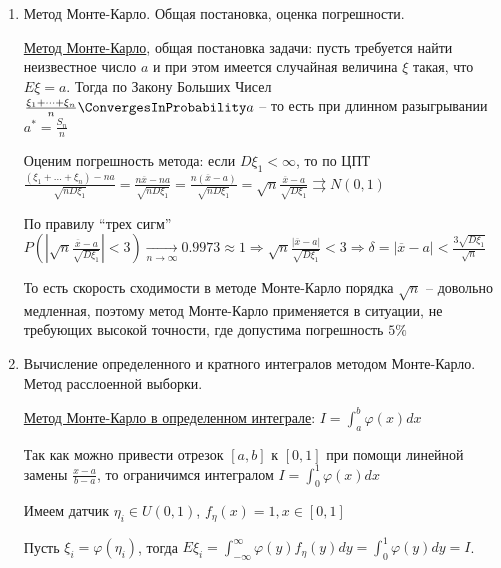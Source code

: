 \documentclass[12pt]{article}
\begin{document}
\begin{enumerate}
\begin{enumerate}[label*=\Roman*. ]
\begin{MyTheorem}
            Тогда $N \in \Pi_\lambda$
        \end{MyTheorem}

        Алгоритм: проводим серию $k$-ую серию испытаний до тех пор, пока $\prod^k_{i = 1} y_i < e^{-\lambda}$, тогда $\xi_i = k$

    \end{enumerate}


    \item Метод Монте-Карло. Общая постановка, оценка погрешности.

    \hyperlink{monte_carlo}{Метод Монте-Карло}, общая постановка задачи: пусть требуется найти неизвестное число $a$ и при этом имеется случайная величина $\xi$ такая, что $E \xi = a$. Тогда по Закону Больших Чисел $\frac{\xi_1 + \dots + \xi_n}{n} \ConvergesInProbability a$ -- то есть при длинном разыгрывании $a^* = \frac{S_n}{n}$

    Оценим погрешность метода: если $D\xi_1 < \infty$, то по ЦПТ $\frac{(\xi_1 + \dots + \xi_n) - n a}{\sqrt{n D \xi_1}} = \frac{n \overline{x} - na}{\sqrt{n D\xi_1}} = \frac{n(\overline{x} - a)}{\sqrt{n D\xi_1}} = \sqrt{n} \frac{\overline{x} - a}{\sqrt{D\xi_1}} \rightrightarrows N(0, 1)$

    По правилу \enquote{трех сигм} $P\left(\left|\sqrt{n} \frac{\overline{x} - a}{\sqrt{D\xi_1}}\right| < 3\right) \underset{n \to \infty}{\longrightarrow} 0.9973 \approx 1 \Longrightarrow \sqrt{n} \frac{|\overline{x} - a|}{\sqrt{D \xi_1}} < 3 \Longrightarrow \delta = |\overline{x} - a| < \frac{3\sqrt{D\xi_1}}{\sqrt{n}}$

    \Nota То есть скорость сходимости в методе Монте-Карло порядка $\sqrt{n}$ -- довольно медленная, поэтому метод Монте-Карло применяется в ситуации, не требующих высокой точности, где допустима погрешность $5\%$

    \item Вычисление определенного и кратного интегралов методом Монте-Карло. Метод расслоенной выборки.

    \hyperlink{monte_carlo_integral}{Метод Монте-Карло в определенном интеграле}: $I = \int_a^b \varphi(x) dx$

    Так как можно привести отрезок $[a, b]$ к $[0, 1]$ при помощи линейной замены $\frac{x - a}{b - a}$, то ограничимся интегралом $I = \int_0^1 \varphi(x) dx$

    Имеем датчик $\eta_i \in U(0, 1)$, $f_{\eta} (x) = 1, x \in [0, 1]$

    Пусть $\xi_i = \varphi(\eta_i)$, тогда $E\xi_i = \int_{-\infty}^{\infty} \varphi(y) f_\eta (y) dy = \int_0^1 \varphi(y) dy = I$. 
    

\end{enumerate}
\end{document}

